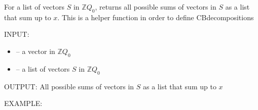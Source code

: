 \documentclass[letterpaper,10pt,english]{sphinxmanual}
\begin{document}
\begin{fulllineitems}
\label{\detokenize{index:quivercombinatorics.vector_decomposition}}
\pysigstartsignatures
\pysiglinewithargsret
{}
{\sphinxparamcomma {}}
{}
\pysigstopsignatures
\sphinxAtStartPar
For a list of vectors \(S\) in \(\mathbb{Z}Q_0\), returns all possible sums of vectors in \(S\) as a list that sum up to \(x\). This is a helper function in order to define CB\sphinxhyphen{}decompositions

\sphinxAtStartPar
INPUT:
\begin{itemize}
\item {} 
\sphinxAtStartPar
{} – a vector in \(\mathbb{Z}Q_0\)

\item {} 
\sphinxAtStartPar
{} – a list of vectors \(S\) in \(\mathbb{Z}Q_0\)

\end{itemize}

\sphinxAtStartPar
OUTPUT: All possible sums of vectors in \(S\) as a list that sum up to \(x\)

\sphinxAtStartPar
EXAMPLE:


\end{fulllineitems}
\end{document}
